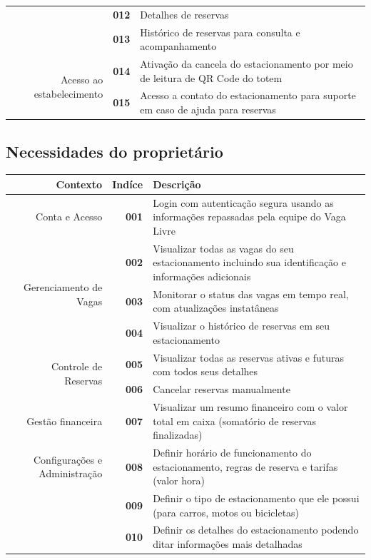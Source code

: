 \documentclass[a4paper,12pt]{article}
\begin{document}
\begin{table}[H]
\begin{tabularx}{\linewidth}{ | r | r | X | }
            & \bf{012} & Detalhes de reservas \\ \cline{2-3}
            & \bf{013} & Histórico de reservas para consulta e acompanhamento \\ \hline
        \multirow{2}{7.5em}{Acesso ao estabelecimento}
            & \bf{014} & Ativação da cancela do estacionamento por meio de leitura de QR Code do totem \\ \cline{2-3}
            & \bf{015} & Acesso a contato do estacionamento para suporte em caso de ajuda para reservas \\
        \hline
    \end{tabularx}
\end{table}

\subsection{Necessidades do proprietário}

\begin{table}[H]
    \begin{tabularx}{\linewidth}{ | r | r | X | }
        \hline
         Contexto & \bf{Indíce} & \bf{Descrição} \\
        \hline
        \multirow{1}{7.5em}{Conta e Acesso}
            & \bf{001} & Login com autenticação segura usando as informações repassadas pela equipe do Vaga Livre \\ \hline
        \multirow{3}{7.5em}{Gerenciamento de Vagas}
            & \bf{002} & Visualizar todas as vagas do seu estacionamento incluindo sua identificação e informações adicionais \\ \cline{2-3}
            & \bf{003} & Monitorar o status das vagas em tempo real, com atualizações instatâneas \\ \cline{2-3}
            & \bf{004} & Visualizar o histórico de reservas em seu estacionamento \\ \hline
        \multirow{2}{7.5em}{Controle de Reservas}
            & \bf{005} & Visualizar todas as reservas ativas e futuras com todos seus detalhes \\ \cline{2-3}
            & \bf{006} & Cancelar reservas manualmente \\ \hline
        \multirow{1}{7.5em}{Gestão financeira}
            & \bf{007} & Visualizar um resumo financeiro com o valor total em caixa (somatório de reservas finalizadas) \\ \hline
        \multirow{1}{7.5em}{Configurações e Administração}
            & \bf{008} & Definir horário de funcionamento do estacionamento, regras de reserva e tarifas (valor hora) \\ 
            & \bf{009} & Definir o tipo de estacionamento que ele possui (para carros, motos ou bicicletas) \\ 
            & \bf{010} & Definir os detalhes do estacionamento podendo ditar informações mais detalhadas \\ 
        \hline
    \end{tabularx}
\end{table}
\end{document}
